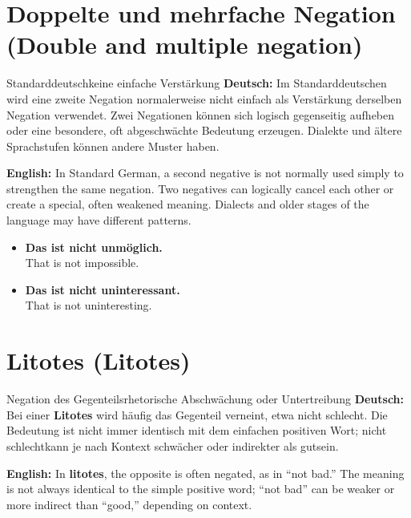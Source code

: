 \documentclass[a4paper,11pt]{article}
\newcommand{\GermanText}[1]{\textbf{Deutsch: }#1\par}
\newcommand{\EnglishText}[1]{{\small\color{SoftGray}\textbf{English: }#1\par}}
\newcommand{\ExampleItem}[2]{\item \textbf{#1}\\{\small\color{SoftGray}#2}}
\begin{document}
\section{Doppelte und mehrfache Negation \textnormal{(Double and multiple negation)}}
\begin{grammarentry}{Standarddeutsch}{keine einfache Verstärkung}
\GermanText{Im Standarddeutschen wird eine zweite Negation normalerweise nicht einfach als Verstärkung derselben Negation verwendet. Zwei Negationen können sich logisch gegenseitig aufheben oder eine besondere, oft abgeschwächte Bedeutung erzeugen. Dialekte und ältere Sprachstufen können andere Muster haben.}
\EnglishText{In Standard German, a second negative is not normally used simply to strengthen the same negation. Two negatives can logically cancel each other or create a special, often weakened meaning. Dialects and older stages of the language may have different patterns.}
\end{grammarentry}
\begin{exbox}\begin{itemize}
\ExampleItem{Das ist nicht unmöglich.}{That is not impossible.}
\ExampleItem{Das ist nicht uninteressant.}{That is not uninteresting.}
\end{itemize}\end{exbox}

\section{Litotes \textnormal{(Litotes)}}
\begin{grammarentry}{Negation des Gegenteils}{rhetorische Abschwächung oder Untertreibung}
\GermanText{Bei einer \textbf{Litotes} wird häufig das Gegenteil verneint, etwa \glqq nicht schlecht\grqq. Die Bedeutung ist nicht immer identisch mit dem einfachen positiven Wort; \glqq nicht schlecht\grqq kann je nach Kontext schwächer oder indirekter als \glqq gut\grqq sein.}
\EnglishText{In \textbf{litotes}, the opposite is often negated, as in ``not bad.'' The meaning is not always identical to the simple positive word; ``not bad'' can be weaker or more indirect than ``good,'' depending on context.}
\end{grammarentry}
\end{document}
